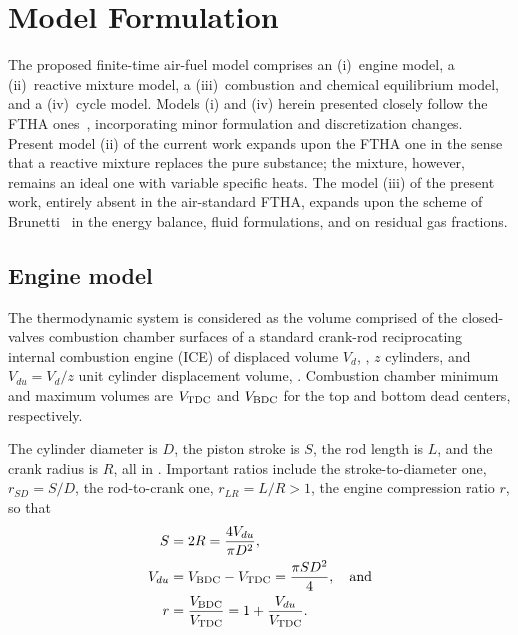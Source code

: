
\section{Model Formulation}\label{sec:model}

    The proposed finite-time air-fuel model comprises an (i)~engine model, a (ii)~reactive mixture model, a (iii)~combustion and
    chemical equilibrium model, and a  (iv)~cycle  model.  Models  (i)  and  (iv)  herein  presented  closely  follow  the  FTHA
    ones~\cite{2017-NaaktgeborenC-IntJMechEngEduc}, incorporating minor formulation and discretization  changes.  Present  model
    (ii) of the current work expands upon the FTHA one in the sense that a reactive mixture replaces  the  pure  substance;  the
    mixture, however, remains an ideal one with variable specific heats. The model (iii) of the present work, entirely absent in
    the air-standard FTHA, expands upon the scheme  of  Brunetti~\cite{2012-BrunettiF-Blucher}  in  the  energy  balance,  fluid
    formulations, and on residual gas fractions.


    \subsection{Engine model}\label{sec:model.engine}

    The thermodynamic system is considered as the volume comprised  of  the  closed-valves  combustion  chamber  surfaces  of  a
    standard crank-rod reciprocating internal combustion engine (ICE) of displaced volume $V_d$,  \meter\cubed,  $z$  cylinders,
    and $V_{du} = V_d / z$ unit cylinder displacement volume, \meter\cubed. Combustion chamber minimum and maximum  volumes  are
    $V_{\mbox{\scriptsize TDC}}$ and $V_{\mbox{\scriptsize BDC}}$ for the top and bottom dead centers, respectively.

    The cylinder diameter is $D$, the piston stroke is $S$, the rod length is $L$, and the crank radius is $R$, all  in  \meter.
    Important ratios include the stroke-to-diameter one, $r_{SD} = S/D$, the rod-to-crank one, $r_{LR} = L/R >  1$,  the  engine
    compression ratio $r$, so that%
    \begin{align}
        \label{eq:S}
        S       &= 2 R = \frac{4 V_{du}}{\pi D^{2}}, \\
        \label{eq:Vdu}
        V_{du}  &= V_{\mbox{\scriptsize BDC}} - V_{\mbox{\scriptsize TDC}} = \frac{\pi SD^2}{4}, \quad\mbox{and} \\
        \label{eq:r}
        r       &= \frac{V_{\mbox{\scriptsize BDC}}}{V_{\mbox{\scriptsize TDC}}} = 1 + \frac{V_{du}}{V_{\mbox{\scriptsize TDC}}}.
    \end{align}

